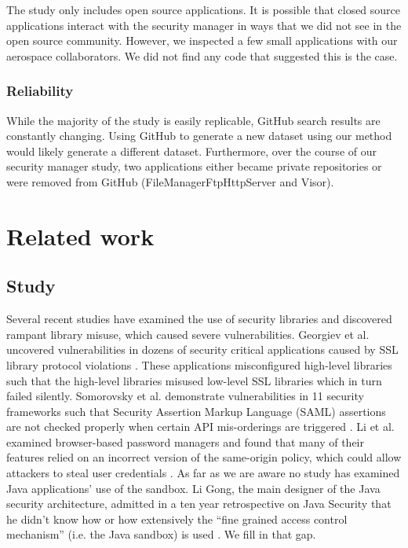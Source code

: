 \documentclass{sig-alternate}
\begin{document}
The study only includes open source applications. It is possible
that closed source applications interact with the security manager
in ways that we did not see in the open source community. However,
we inspected a few small applications with our aerospace collaborators.
We did not find any code that suggested this is the case. 

\subsubsection{Reliability}

While the majority of the study is easily replicable, GitHub search results are constantly
changing. Using GitHub to generate a new dataset using our method
would likely generate a different dataset. Furthermore, over the course of our security
manager study, two applications either became private repositories
or were removed from GitHub (FileManagerFtpHttpServer and Visor).

\section{Related work}
\label{sec:related}

\subsection{Study}

Several recent studies have examined the use of security libraries
and discovered rampant library misuse, which caused severe vulnerabilities.
Georgiev et al. uncovered vulnerabilities in dozens of security critical
applications caused by SSL library protocol violations \cite{georgiev12most-dangerous}.
These applications misconfigured high-level libraries such that the
high-level libraries misused low-level SSL libraries which in turn
failed silently. Somorovsky et al. demonstrate vulnerabilities in
11 security frameworks such that Security Assertion Markup Language
(SAML) assertions are not checked properly when certain API mis-orderings
are triggered \cite{somorovsky12breaking}. Li et al. examined browser-based
password managers and found that many of their features relied on
an incorrect version of the same-origin policy, which could allow
attackers to steal user credentials \cite{li2014emperor}. As far
as we are aware no study has examined Java applications' use of the
sandbox. Li Gong, the main designer of the Java security architecture,
admitted in a ten year retrospective on Java Security that he didn't
know how or how extensively the ``fine grained access control mechanism''
(i.e. the Java sandbox) is used \cite{gong2009java}. We fill in that
gap. 
\end{document}
